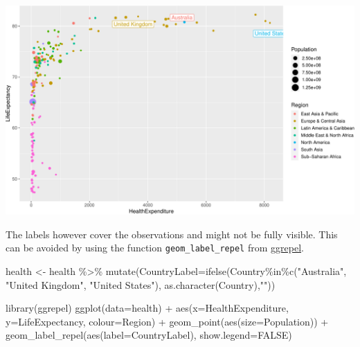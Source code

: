 \documentclass[
]{book}
\newenvironment{Shaded}{\begin{snugshade}}{\end{snugshade}}
\newcommand{\AttributeTok}[1]{\textcolor[rgb]{0.77,0.63,0.00}{#1}}
\newcommand{\ConstantTok}[1]{\textcolor[rgb]{0.00,0.00,0.00}{#1}}
\newcommand{\FunctionTok}[1]{\textcolor[rgb]{0.00,0.00,0.00}{#1}}
\newcommand{\NormalTok}[1]{#1}
\newcommand{\OtherTok}[1]{\textcolor[rgb]{0.56,0.35,0.01}{#1}}
\newcommand{\SpecialCharTok}[1]{\textcolor[rgb]{0.00,0.00,0.00}{#1}}
\newcommand{\StringTok}[1]{\textcolor[rgb]{0.31,0.60,0.02}{#1}}
\begin{document}
\includegraphics[width=\textwidth]{bookdown-demo_files/figure-latex/unnamed-chunk-56-1}

The labels however cover the observations and might not be fully visible. This can be avoided by using the function \texttt{geom\_label\_repel} from \href{https://cran.r-project.org/web/packages/ggrepel}{ggrepel}.

\begin{Shaded}
\begin{Highlighting}[]
\NormalTok{health }\OtherTok{\textless{}{-}}\NormalTok{ health }\SpecialCharTok{\%\textgreater{}\%}
    \FunctionTok{mutate}\NormalTok{(}\AttributeTok{CountryLabel=}\FunctionTok{ifelse}\NormalTok{(Country}\SpecialCharTok{\%in\%}\FunctionTok{c}\NormalTok{(}\StringTok{"Australia"}\NormalTok{, }\StringTok{"United Kingdom"}\NormalTok{, }\StringTok{"United States"}\NormalTok{),}
                               \FunctionTok{as.character}\NormalTok{(Country),}\StringTok{""}\NormalTok{))}

\FunctionTok{library}\NormalTok{(ggrepel)}
\FunctionTok{ggplot}\NormalTok{(}\AttributeTok{data=}\NormalTok{health) }\SpecialCharTok{+} 
    \FunctionTok{aes}\NormalTok{(}\AttributeTok{x=}\NormalTok{HealthExpenditure,  }\AttributeTok{y=}\NormalTok{LifeExpectancy, }\AttributeTok{colour=}\NormalTok{Region) }\SpecialCharTok{+}
    \FunctionTok{geom\_point}\NormalTok{(}\FunctionTok{aes}\NormalTok{(}\AttributeTok{size=}\NormalTok{Population)) }\SpecialCharTok{+}
    \FunctionTok{geom\_label\_repel}\NormalTok{(}\FunctionTok{aes}\NormalTok{(}\AttributeTok{label=}\NormalTok{CountryLabel), }\AttributeTok{show.legend=}\ConstantTok{FALSE}\NormalTok{)}
\end{Highlighting}
\end{Shaded}
\end{document}

